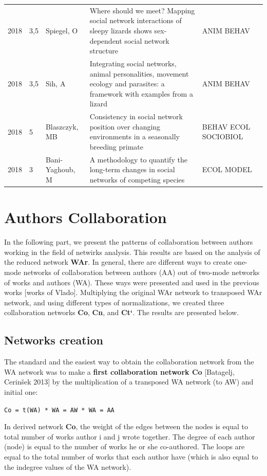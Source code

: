 \documentclass[11pt]{article} %
\begin{document}
\begin{longtable}{p{0.8cm}|p{1.25cm}|p{2.8cm}|p{7.5cm}|p{3cm}l}
2018&	3,5&	Spiegel, O&	 Where should we meet? Mapping social network interactions of sleepy lizards shows sex-dependent social network structure&         	ANIM BEHAV\\
2018&	3,5&	Sih, A&	 Integrating social networks, animal personalities, movement ecology and parasites: a framework with examples from a lizard&         	ANIM BEHAV\\
2018&	5&	Blaszczyk, MB&	 Consistency in social network position over changing environments in a seasonally breeding primate&         	BEHAV ECOL SOCIOBIOL\\
2018&	3&	Bani-Yaghoub, M&	 A methodology to quantify the long-term changes in social networks of competing species&         	ECOL MODEL\\
\end{longtable}


\section{Authors Collaboration}  

In the following part, we present the patterns of collaboration between authors working in the field of netwirks analysis. This results are based on the analysis of the reduced network \textbf{WAr}. In general, there are different ways to create one-mode networks of collaboration between authors (AA) out of two-mode networks of works and authors (WA). These ways were presented and used in the previous works [works of Vlado]. Multiplying the original WAr network to transposed WAr network, and using different types of normalizations, we created three collaboration networks \textbf{Co}, \textbf{Cn}, and \textbf{Ct`}. The results are presented below. \medskip  

\subsection{Networks creation}  

The standard and the easiest way to obtain the collaboration network from the WA network was to make a \textbf{first collaboration network Co} [Batagelj, Cerinšek 2013] by the multiplication of a transposed WA network (to AW) and initial one: \medskip 

\texttt{Co = t(WA) * WA = AW * WA = AA} \medskip  

In derived network  \textbf{Co}, the weight of the edges between the nodes is equal to total number of works author i and j wrote together. The degree of each author (node) is equal to the number of works he or she co-authored. The loops are equal to the total number of works that each author have (which is also equal to the indegree values of the WA network). \medskip 
\end{document}
